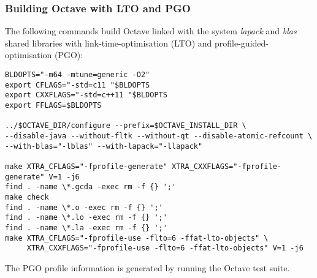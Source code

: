 \documentclass[a4paper,twoside,10pt,english]{report}
\begin{document}
\subsubsection*{Building Octave with LTO and PGO}
The following commands build Octave linked with the system \emph{lapack} and
\emph{blas} shared libraries with link-time-optimisation (LTO) and
profile-guided-optimisation (PGO):
\begin{small}
\begin{verbatim}
BLDOPTS="-m64 -mtune=generic -O2"
export CFLAGS="-std=c11 "$BLDOPTS
export CXXFLAGS="-std=c++11 "$BLDOPTS
export FFLAGS=$BLDOPTS

../$OCTAVE_DIR/configure --prefix=$OCTAVE_INSTALL_DIR \
--disable-java --without-fltk --without-qt --disable-atomic-refcount \
--with-blas="-lblas" --with-lapack="-llapack"

make XTRA_CFLAGS="-fprofile-generate" XTRA_CXXFLAGS="-fprofile-generate" V=1 -j6 
find . -name \*.gcda -exec rm -f {} ';'
make check
find . -name \*.o -exec rm -f {} ';'
find . -name \*.lo -exec rm -f {} ';'
find . -name \*.la -exec rm -f {} ';'
make XTRA_CFLAGS="-fprofile-use -flto=6 -ffat-lto-objects" \
     XTRA_CXXFLAGS="-fprofile-use -flto=6 -ffat-lto-objects" V=1 -j6 
\end{verbatim}
\end{small}
The PGO profile information is generated by running the Octave test suite.
\end{document}
